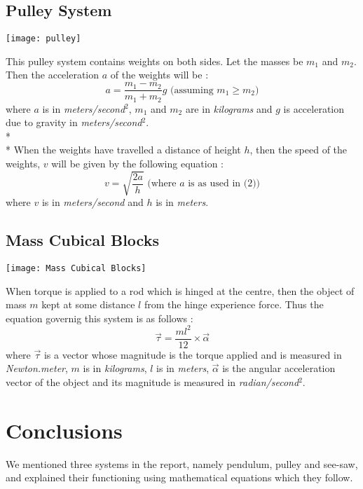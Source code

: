 \documentclass[11pt]{article}
\begin{document}
\subsection{Pulley System}
\begin{center}
\texttt{[image: pulley]}
\end{center}
This pulley\cite{pulley} system contains weights on both sides. Let the masses be $m_1$ and $m_2$. Then the acceleration $a$ of the weights will be :
\begin{equation}
                                                   a = \frac{m_1 - m_2}{m_1 + m_2}g \mbox{ (assuming $m_1 \geq m_2$)}
\end{equation}
where $a$ is in \emph{meters/second$^2$}, $m_1$ and $m_2$ are in \emph{kilograms} and $g$ is acceleration due to gravity in \emph{meters/second$^2$}.\\*\\*
When the weights have travelled a distance of height $h$, then the speed of the weights, $v$ will be given by the following equation :
\begin{equation}
                                                 v = \sqrt{\frac{2a}{h}} \mbox{ (where $a$ is as used in (2))}
\end{equation}
where $v$ is in \emph{meters/second} and $h$ is in \emph{meters}.

\subsection{Mass Cubical Blocks}
\begin{center}
\texttt{[image: Mass Cubical Blocks]}
\end{center}
When torque\cite{seesaw} is applied to a rod which is hinged at the centre, then the object of mass $m$ kept at some distance $l$ from the hinge experience force. Thus the equation governig this system is as follows :
\begin{equation}
  \vec{\tau} = \frac{ml^2}{12} \times \vec{\alpha}
\end{equation}
where $\vec{\tau}$ is a vector whose magnitude is the torque applied and is measured in \emph{Newton.meter}, $m$ is in \emph{kilograms}, $l$ is in \emph{meters}, $\vec{\alpha}$ is the angular acceleration vector of the object and its magnitude is measured in \emph{radian/second$^2$}.
\section{Conclusions}
We mentioned three systems in the report, namely pendulum, pulley and see-saw, and explained their functioning using mathematical equations which they follow.


\end{document}
